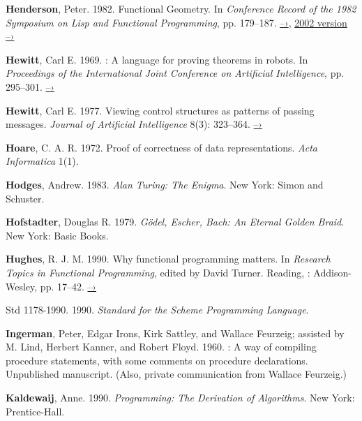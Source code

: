  \label{Henderson 1982}
\textbf{Henderson}, Peter. 1982. Functional Geometry. In \textit{Conference Record of the
1982  Symposium on Lisp and Functional Programming}, pp. 179--187.
\href{http://pmh-systems.co.uk/phAcademic/papers/funcgeo.pdf}{–›},
\href{http://eprints.soton.ac.uk/257577/1/funcgeo2.pdf}{2002 version –›}

 \label{Hewitt (1969)}
\textbf{Hewitt}, Carl E.  1969.  : A language for proving
theorems in robots.  In \textit{Proceedings of the International Joint
Conference on Artificial Intelligence}, pp. 295--301.
\href{http://dspace.mit.edu/handle/1721.1/6171}{–›}

 \label{Hewitt (1977)}
\textbf{Hewitt}, Carl E.  1977.  Viewing control structures as patterns of passing
messages.  \textit{Journal of Artificial Intelligence} 8(3): 323--364.
\href{http://dspace.mit.edu/handle/1721.1/6272}{–›}

 \label{Hoare (1972)}
\textbf{Hoare}, C. A. R. 1972.  Proof of correctness of data representations.
\textit{Acta Informatica} 1(1).

 \label{Hodges 1983}
\textbf{Hodges}, Andrew. 1983.  \textit{Alan Turing: The Enigma}. New York: Simon and
Schuster.

 \label{Hofstadter 1979}
\textbf{Hofstadter}, Douglas R.  1979.  \textit{G\"odel, Escher, Bach: An Eternal Golden
Braid}. New York: Basic Books.

 \label{Hughes 1990}
\textbf{Hughes}, R. J. M.  1990.  Why functional programming matters.  In \textit{Research
Topics in Functional Programming}, edited by David Turner.  Reading, :
Addison-Wesley, pp. 17--42.
\href{http://www.cs.kent.ac.uk/people/staff/dat/miranda/whyfp90.pdf}{–›}

 \label{IEEE 1990}
 Std 1178-1990.  1990.  \textit{ Standard for the
Scheme Programming Language}.

\enlargethispage{\baselineskip}

 \label{Ingerman et al. 1960}
\textbf{Ingerman}, Peter, Edgar Irons, Kirk Sattley, and Wallace Feurzeig; assisted by
M. Lind, Herbert Kanner, and Robert Floyd.  1960.  : A way of
compiling procedure statements, with some comments on procedure declarations.
Unpublished manuscript.  (Also, private communication from Wallace Feurzeig.)

 \label{Kaldewaij 1990}
\textbf{Kaldewaij}, Anne. 1990.  \textit{Programming: The Derivation of Algorithms}. New
York: Prentice-Hall.

